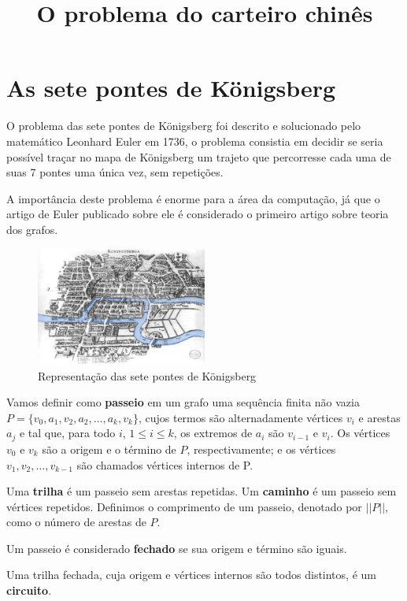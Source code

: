 \documentclass{article}
\title{O problema do carteiro chinês}
\date{}
\begin{document}
\maketitle

\section{As sete pontes de Königsberg}

O problema das sete pontes de Königsberg foi descrito e solucionado pelo matemático Leonhard Euler em 1736, o problema consistia em decidir se seria possível traçar no mapa de Königsberg um trajeto que percorresse cada uma de suas 7 pontes uma única vez, sem repetições.

A importância deste problema é enorme para a área da computação, já que o artigo de Euler publicado sobre ele é considerado o primeiro artigo sobre teoria dos grafos.

\begin{figure} 
    \centering
    \includegraphics[width=0.5\textwidth]{konigsberg.png}
    \caption{Representação das sete pontes de Königsberg}
\end{figure}

Vamos definir como \textbf{passeio} em um grafo uma sequência finita não vazia $P = \{ v_0, a_1, v_2, a_2, \dots, a_k, v_k\}$, cujos termos são alternadamente vértices $v_i$ e arestas $a_j$ e tal que, para todo $i$, $1 \leq i \leq k$, os extremos de $a_i$ são $v_{i-1}$ e $v_i$. 
Os vértices $v_0$ e $v_k$ são a origem e o término de $P$, respectivamente; e os vértices $v_1, v_2, \dots, v_{k-1}$ são chamados vértices internos de P. 

Uma \textbf{trilha} é um passeio sem arestas repetidas. 
Um \textbf{caminho} é um passeio sem vértices repetidos.
Definimos o comprimento de um passeio, denotado por $||P||$, como o número de arestas de $P$.

Um passeio é considerado \textbf{fechado} se sua origem e término são iguais.

Uma trilha fechada, cuja origem e vértices internos são todos distintos, é um \textbf{circuito}.
\end{document}
